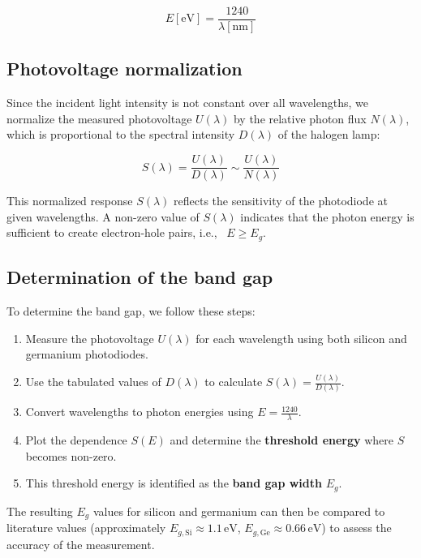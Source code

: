\documentclass[english,11pt,a4paper]{article}
\begin{document}
\begin{multicols}{2}
		
		\begin{equation}
			E[\mathrm{eV}] = \frac{1240}{\lambda[\mathrm{nm}]}
		\end{equation}
		
		
		\subsection{Photovoltage normalization}
		
		Since the incident light intensity is not constant over all wavelengths, we normalize the measured photovoltage $U(\lambda)$ by the relative photon flux $N(\lambda)$, which is proportional to the spectral intensity $D(\lambda)$ of the halogen lamp:
		
		
		
		\begin{equation}
			S(\lambda) = \frac{U(\lambda)}{D(\lambda)} \sim \frac{U(\lambda)}{N(\lambda)}
		\end{equation}
		
		
		This normalized response $S(\lambda)$ reflects the sensitivity of the photodiode at given wavelengths. A non-zero value of $S(\lambda)$ indicates that the photon energy is sufficient to create electron-hole pairs, i.e., \ $E \geq E_g$.
		
		\subsection{Determination of the band gap}
		
		To determine the band gap, we follow these steps:
		
		\begin{enumerate}
			\item Measure the photovoltage $U(\lambda)$ for each wavelength using both silicon and germanium photodiodes.
			\item Use the tabulated values of $D(\lambda)$ to calculate $S(\lambda) = \frac{U(\lambda)}{D(\lambda)}$.
			\item Convert wavelengths to photon energies using $E = \frac{1240}{\lambda}$.
			\item Plot the dependence $S(E)$ and determine the \textbf{threshold energy} where $S$ becomes non-zero.
			\item This threshold energy is identified as the \textbf{band gap width} $E_g$.
		\end{enumerate}
		
		The resulting $E_g$ values for silicon and germanium can then be compared to literature values\cite{NIST}  (approximately $E_{g,\mathrm{Si}} \approx 1.1 \, \mathrm{eV}$, $E_{g,\mathrm{Ge}}\approx 0.66 \, \mathrm{eV}$) to assess the accuracy of the measurement.
		

\end{multicols}
\end{document}
